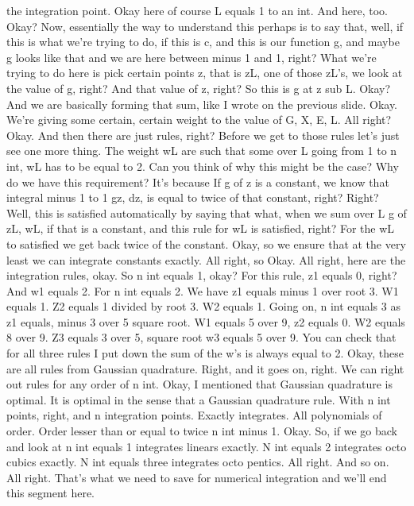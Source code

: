 \documentclass[10pt]{article}
\begin{document}
{the integration point. Okay here of course L equals 1 to an int. And here, too. Okay? Now, essentially the way to understand this perhaps is to say that, well, if this is what we're trying to do, if this is c, and this is our function g, and maybe g looks like that and we are here between minus 1 and 1, right? What we're trying to do here is pick certain points z, that is zL, one of those zL's, we look at the value of g, right? And that value of z, right? So this is g at z sub L. Okay? And we are basically forming that sum, like I wrote on the previous slide. Okay. We're giving some certain, certain weight to the value of G, X, E, L. All right? Okay. And then there are just rules, right? Before we get to those rules let's just see one more thing. The weight wL are such that some over L going from 1 to n int, wL has to be equal to 2. Can you think of why this might be the case? Why do we have this requirement? It's because If g of z is a constant, we know that integral minus 1 to 1 gz, dz, is equal to twice of that constant, right? Right? Well, this is satisfied automatically by saying that what, when we sum over L g of zL, wL, if that is a constant, and this rule for wL is satisfied, right? For the wL to satisfied we get back twice of the constant. Okay, so we ensure that at the very least we can integrate constants exactly. All right, so Okay. All right, here are the integration rules, okay. So n int equals 1, okay? For this rule, z1 equals 0, right? And w1 equals 2. For n int equals 2. We have z1 equals minus 1 over root 3. W1 equals 1. Z2 equals 1 divided by root 3. W2 equals 1. Going on, n int equals 3 as z1 equals, minus 3 over 5 square root. W1 equals 5 over 9, z2 equals 0. W2 equals 8 over 9. Z3 equals 3 over 5, square root w3 equals 5 over 9. You can check that for all three rules I put down the sum of the w's is always equal to 2. Okay, these are all rules from Gaussian quadrature. Right, and it goes on, right. We can right out rules for any order of n int. Okay, I mentioned that Gaussian quadrature is optimal. It is optimal in the sense that a Gaussian quadrature rule. With n int points, right, and n integration points. Exactly integrates. All polynomials of order. Order lesser than or equal to twice n int minus 1. Okay. So, if we go back and look at n int equals 1 integrates linears exactly. N int equals 2 integrates octo cubics exactly. N int equals three integrates octo pentics. All right. And so on. All right. That's what we need to save for numerical integration and we'll end this segment here.

}
\end{document}
